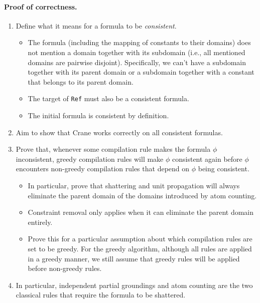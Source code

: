 \documentclass{article}
\begin{document}
\paragraph{Proof of correctness.}
\begin{enumerate}
  \item Define what it means for a formula to be \emph{consistent}.
        \begin{itemize}
          \item The formula (including the mapping of constants to their
                domains) does not mention a domain together with its subdomain
                (i.e., all mentioned domains are pairwise disjoint).
                Specifically, we can't have a subdomain together with its parent
                domain or a subdomain together with a constant that belongs to
                its parent domain.
          \item The target of \texttt{Ref} must also be a consistent formula.
          \item The initial formula is consistent by definition.
        \end{itemize}
  \item Aim to show that Crane works correctly on all consistent formulas.
  \item Prove that, whenever some compilation rule makes the formula $\phi$
        inconsistent, greedy compilation rules will make $\phi$ consistent again
        before $\phi$ encounters non-greedy compilation rules that depend on
        $\phi$ being consistent.
        \begin{itemize}
          \item In particular, prove that shattering and unit propagation will
                always eliminate the parent domain of the domains introduced by
                atom counting.
          \item Constraint removal only applies when it can eliminate the parent
                domain entirely.
          \item Prove this for a particular assumption about which compilation
                rules are set to be greedy. For the greedy algorithm, although
                all rules are applied in a greedy manner, we still assume that
                greedy rules will be applied before non-greedy rules.
        \end{itemize}
  \item In particular, independent partial groundings and atom counting are the
        two classical rules that require the formula to be shattered.
  \end{enumerate}
\end{document}

